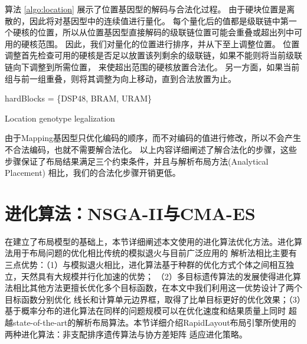 算法 \ref{algo:location} 展示了位置基因型的解码与合法化过程。
由于硬块位置是离散的，因此将对基因型中的连续值进行量化。
每个量化后的值都是级联链中第一个硬核的位置，所以从位置基因型直接解码的级联链位置可能会重叠或超出列中可用的硬核范围。
因此，我们对量化的位置进行排序，并从下至上调整位置。
位置调整首先检查可用的硬核是否足以放置该列剩余的级联链，如果不能则将当前级联链向下调整到所需位置，
来使超出范围的硬核放置合法化。
另一方面，如果当前组与前一组重叠，则将其调整为向上移动，直到合法放置为止。

\begin{algorithm}
	
	
	hardBlocks = \{DSP48, BRAM, URAM\}\;
	
	\caption{Location genotype legalization}	
	\label{algo:location}
\end{algorithm}

由于Mapping基因型只优化编码的顺序，而不对编码的值进行修改，所以不会产生不合法编码，也就不需要解合法化。
以上内容详细阐述了解合法化的步骤，这些步骤保证了布局结果满足三个约束条件，并且与解析布局方法(Analytical Placement)
相比，我们的合法化步骤开销更低。









\section{进化算法：NSGA-II与CMA-ES}

在建立了布局模型的基础上，本节详细阐述本文使用的进化算法优化方法。进化算法用于布局问题的优化相比传统的模拟退火与目前广泛应用的
解析法相比主要有三点优势：（1）与模拟退火相比，进化算法基于种群的优化方式个体之间相互独立，天然具有大规模并行化加速的优势；
（2）多目标遗传算法的发展使得进化算法相比其他方法更擅长优化多个目标函数，在本文中我们利用这一优势设计了两个目标函数分别优化
线长和计算单元边界框，取得了比单目标更好的优化效果；（3）基于概率分布的进化算法在同样的问题规模可以在优化速度和结果质量上同时
超越state-of-the-art的解析布局算法。本节详细介绍RapidLayout布局引擎所使用的两种进化算法：非支配排序遗传算法与协方差矩阵
适应进化策略。

